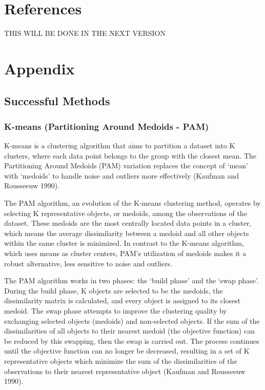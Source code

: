 \documentclass[11pt, a4paper]{article}
\begin{document}
\pagebreak
\section{References}

THIS WILL BE DONE IN THE NEXT VERSION 





\renewcommand{\bibsection}{}

















\pagebreak
\appendix
\section{Appendix}


\subsection{Successful Methods}\label{appendix:successful}


\subsubsection{K-means (Partitioning Around Medoids - PAM)}

K-means is a clustering algorithm that aims to partition a dataset into K clusters, where each data point belongs to the group with the closest mean. The Partitioning Around Medoids (PAM) variation replaces the concept of `mean' with `medoids' to handle noise and outliers more effectively  (Kaufman and Rousseeuw 1990).
\par
The PAM algorithm, an evolution of the K-means clustering method, operates by selecting K representative objects, or medoids, among the observations of the dataset. These medoids are the most centrally located data points in a cluster, which means the average dissimilarity between a medoid and all other objects within the same cluster is minimized. In contrast to the K-means algorithm, which uses means as cluster centers, PAM's utilization of medoids makes it a robust alternative, less sensitive to noise and outliers.
\par
The PAM algorithm works in two phases: the `build phase' and the `swap phase'. During the build phase, K objects are selected to be the medoids, the dissimilarity matrix is calculated, and every object is assigned to its closest medoid. The swap phase attempts to improve the clustering quality by exchanging selected objects (medoids) and non-selected objects. If the sum of the dissimilarities of all objects to their nearest medoid (the objective function) can be reduced by this swapping, then the swap is carried out. The process continues until the objective function can no longer be decreased, resulting in a set of K representative objects which minimize the sum of the dissimilarities of the observations to their nearest representative object (Kaufman and Rousseeuw 1990).
\end{document}
